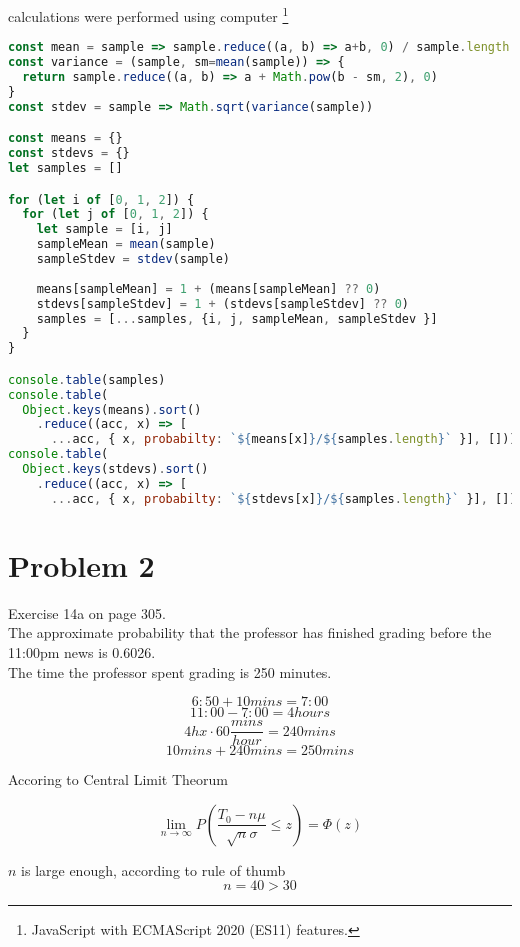 \documentclass[a4paper,11pt]{article}
\begin{document}
\clearpage

calculations were performed using computer \footnote[1]{JavaScript with ECMAScript 2020 (ES11) features.}
\begin{lstlisting}[language=JavaScript]
const mean = sample => sample.reduce((a, b) => a+b, 0) / sample.length
const variance = (sample, sm=mean(sample)) => {
  return sample.reduce((a, b) => a + Math.pow(b - sm, 2), 0)
}
const stdev = sample => Math.sqrt(variance(sample))

const means = {}
const stdevs = {}
let samples = []

for (let i of [0, 1, 2]) {
  for (let j of [0, 1, 2]) {
    let sample = [i, j]
    sampleMean = mean(sample)
    sampleStdev = stdev(sample)
    
    means[sampleMean] = 1 + (means[sampleMean] ?? 0)
    stdevs[sampleStdev] = 1 + (stdevs[sampleStdev] ?? 0)
    samples = [...samples, {i, j, sampleMean, sampleStdev }]
  }
}

console.table(samples)
console.table(
  Object.keys(means).sort()
    .reduce((acc, x) => [ 
      ...acc, { x, probabilty: `${means[x]}/${samples.length}` }], []))
console.table(
  Object.keys(stdevs).sort()
    .reduce((acc, x) => [ 
      ...acc, { x, probabilty: `${stdevs[x]}/${samples.length}` }], []))
\end{lstlisting}

\clearpage

\section*{Problem 2}

Exercise 14a on page 305. \\

The approximate probability that the professor has finished grading before the 11:00pm news is 0.6026.\\

The time the professor spent grading is 250 minutes.

\[ 6:50 + 10 mins = 7:00 \]
\[ 11:00 - 7:00  = 4 hours \]
\[ 4h x \cdot 60\frac{mins}{hour} = 240 mins \]
\[ 10 mins + 240 mins = 250 mins \]

Accoring to Central Limit Theorum

\[ \lim_{n \rightarrow \infty} P\left(\frac{T_0 - n \mu}{\sqrt{n} \sigma} \le z \right) = \Phi(z) \]

\vspace{1cm}
$n$ is large enough, according to rule of thumb
\[ n = 40 > 30\]
\end{document}
